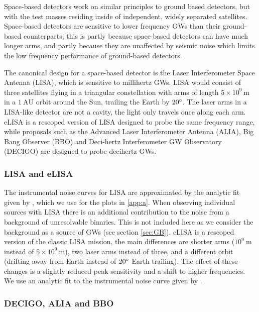 Space-based detectors work on similar principles to ground based detectors, but with the test masses residing inside of independent, widely separated satellites. Space-based detectors are sensitive to lower frequency GWs than their ground-based counterparts; this is partly because space-based detectors can have much longer arms, and partly because they are unaffected by seismic noise which limits the low frequency performance of ground-based detectors. 

The canonical design for a space-based detector is the Laser Interferometer Space Antenna (LISA), which is sensitive to millihertz GWs. LISA would consist of three satellites flying in a triangular constellation with arms of length $5\times 10^{9}~\mathrm{m}$ in a $1~\mathrm{AU}$ orbit around the Sun, trailing the Earth by $20^\circ$. The laser arms in a LISA-like detector are not a cavity, the light only travels once along each arm. eLISA is a rescoped version of LISA designed to probe the same frequency range, while proposals such as the Advanced Laser Interferometer Antenna (ALIA), Big Bang Observer (BBO) and Deci-hertz Interferometer GW Observatory (DECIGO) are designed to probe decihertz GWs.

\subsubsection{LISA and eLISA}

The instrumental noise curves for LISA are approximated by the analytic fit given by \citet{Sathyaprakash}, which we use for the plots in \ref{app:a}. When observing individual sources with LISA there is an additional contribution to the noise from a background of unresolvable binaries. This is not included here as we consider the background as a source of GWs (see section \ref{sec:GB}). eLISA is a rescoped version of the classic LISA mission, the main differences are shorter arms ($10^{9}~\mathrm{m}$ instead of $5\times 10^{9}~\mathrm{m}$), two laser arms instead of three, and a different orbit (drifting away from Earth instead of $20^\circ$ Earth trailing). The effect of these changes is a slightly reduced peak sensitivity and a shift to higher frequencies. We use an analytic fit to the instrumental noise curve given by \citet{Amaro-Seoane-et-al}.

\subsubsection{DECIGO, ALIA and BBO}

